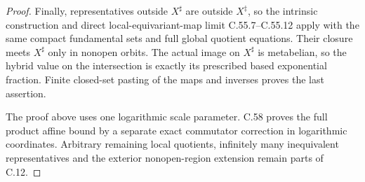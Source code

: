 \begin{proof}
Finally, representatives outside $X^\sharp$
are outside $X^\ddagger$, so the intrinsic
construction and direct local-equivariant-map
limit C.55.7--C.55.12 apply with the same
compact fundamental sets and full global
quotient equations.
Their closure meets $X^\sharp$ only in
nonopen orbits. The actual image on
$X^\sharp$ is metabelian, so the hybrid
value on the intersection is exactly its
prescribed based exponential fraction.
Finite closed-set pasting of the maps and
inverses proves the last assertion.

The proof above uses one logarithmic scale parameter. C.58 proves the full product affine bound by a separate exact commutator correction in logarithmic coordinates. Arbitrary remaining
local quotients, infinitely many inequivalent
representatives and the exterior nonopen-region
extension remain parts of C.12.
\end{proof}
